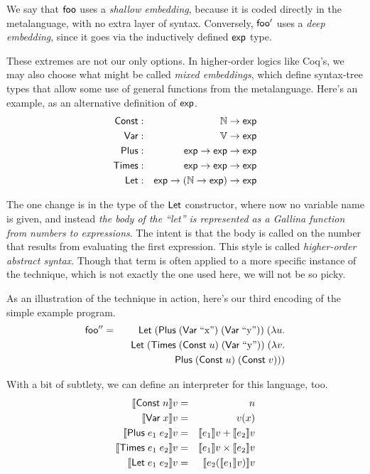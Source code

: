 \documentclass{amsbook}
\theoremstyle{definition}
\theoremstyle{remark}
\numberwithin{section}{chapter}
\numberwithin{equation}{chapter}
\begin{document}
We say that $\mathsf{foo}$ uses a \emph{shallow embedding}, because it is coded directly in the metalanguage, with no extra layer of syntax.
Conversely, $\mathsf{foo'}$ uses a \emph{deep embedding}, since it goes via the inductively defined $\mathsf{exp}$ type.

These extremes are not our only options.
In higher-order logics like Coq's, we may also choose what might be called \emph{mixed embeddings}, which define syntax-tree types that allow some use of general functions from the metalanguage.
Here's an example, as an alternative definition of $\mathsf{exp}$.
\encoding
\begin{eqnarray*}
  \mathsf{Const} &:& \mathbb N \to \mathsf{exp} \\
  \mathsf{Var} &:& \mathbb V \to \mathsf{exp} \\
  \mathsf{Plus} &:& \mathsf{exp} \to \mathsf{exp} \to \mathsf{exp} \\
  \mathsf{Times} &:& \mathsf{exp} \to \mathsf{exp} \to \mathsf{exp} \\
  \mathsf{Let} &:& \mathsf{exp} \to (\mathbb N \to \mathsf{exp}) \to \mathsf{exp}
\end{eqnarray*}

The one change is in the type of the $\mathsf{Let}$ constructor, where now no variable name is given, and instead \emph{the body of the ``let'' is represented as a Gallina function from numbers to expressions}.
The intent is that the body is called on the number that results from evaluating the first expression.
This style is called \emph{higher-order abstract syntax}.
Though that term is often applied to a more specific instance of the technique, which is not exactly the one used here, we will not be so picky.

As an illustration of the technique in action, here's our third encoding of the simple example program.
\begin{eqnarray*}
  \mathsf{foo''} &=& \mathsf{Let} \; (\mathsf{Plus} \; (\mathsf{Var} \; \textrm{``x''}) \; (\mathsf{Var} \; \textrm{``y''})) \; (\lambda u. \\
  && \hspace{.1in} \mathsf{Let} \; (\mathsf{Times} \; (\mathsf{Const} \; u) \; (\mathsf{Var} \; \textrm{``y''})) \; (\lambda v. \\
  && \hspace{.2in} \mathsf{Plus} \; (\mathsf{Const} \; u) \; (\mathsf{Const} \; v)))
\end{eqnarray*}

With a bit of subtlety, we can define an interpreter for this language, too.
\begin{eqnarray*}
  {\left \llbracket \mathsf{Const} \; n \right \rrbracket}v &=& n \\
  {\left \llbracket \mathsf{Var} \; x \right \rrbracket}v &=& v(x) \\
  {\left \llbracket \mathsf{Plus} \; e_1 \; e_2 \right \rrbracket}v &=& {\left \llbracket e_1 \right \rrbracket}v + {\left \llbracket e_2 \right \rrbracket}v \\
  {\left \llbracket \mathsf{Times} \; e_1 \; e_2 \right \rrbracket}v &=& {\left \llbracket e_1 \right \rrbracket}v \times {\left \llbracket e_2 \right \rrbracket}v \\
  {\left \llbracket \mathsf{Let} \; e_1 \; e_2 \right \rrbracket}v &=& {\left \llbracket e_2({\left \llbracket e_1 \right \rrbracket}v) \right \rrbracket}v
\end{eqnarray*}
\end{document}

